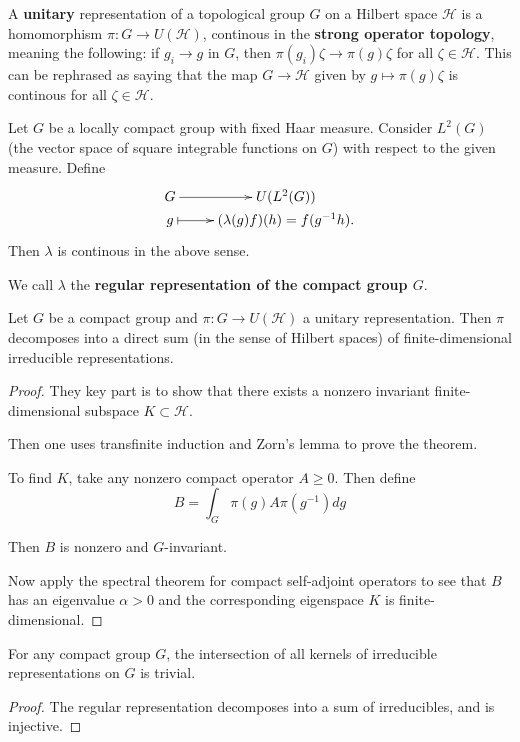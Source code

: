 \documentclass[11pt, english]{article}
\begin{document}
A \textbf{unitary} representation of a topological group $G$ on a Hilbert space $\mathcal H$ is a homomorphism $\pi:G \to U(\mathcal H)$, continous in the \textbf{strong operator topology}, meaning the following: if $g_i \to g$ in $G$, then $\pi(g_i) \zeta \to \pi(g)\zeta$ for all $\zeta \in \mathcal H$. This can be rephrased as saying that the map $G \to \mathcal H$ given by $g \mapsto \pi(g) \zeta $ is continous for all $\zeta \in \mathcal H$.

\begin{example}
 Let $G$ be a locally compact group with fixed Haar measure. Consider $L^2(G)$ (the vector space of square integrable functions on $G$) with respect to the given measure. Define
$$
\xymatrix @ R = 0mm{
G \ar[r] &U(L^2(G)) \\
g \ar@{|->}[r] & (\lambda(g)f)(h) = f(g^{-1}h).
}
$$
Then $\lambda$ is continous in the above sense.

We call $\lambda$ the \textbf{regular representation of the compact group $G$}.
\end{example}

\begin{thm}
\label{thmpeterweyl}
Let $G$ be a compact group and $\pi:G \to U(\mathcal H)$ a unitary representation. Then $\pi$ decomposes into a direct sum (in the sense of Hilbert spaces) of finite-dimensional irreducible representations.  
\end{thm}

\begin{proof}
They key part is to show that there exists a nonzero invariant finite-dimensional subspace $K \subset \mathcal H$. 

Then one uses transfinite induction and Zorn's lemma to prove the theorem.

To find $K$, take any nonzero compact operator $A \geq 0$. Then define 
$$
B = \int_G \pi(g) A \pi(g^{-1}) dg
$$

Then $B$ is nonzero and $G$-invariant. 

Now apply the spectral theorem for compact self-adjoint operators to see that $B$ has an eigenvalue $\alpha > 0$ and the corresponding eigenspace $K$ is finite-dimensional.
\end{proof}

\begin{corr}
For any compact group $G$, the intersection of all kernels of irreducible representations on $G$ is trivial.
\end{corr}
\begin{proof}
The regular representation decomposes into a sum of irreducibles, and is injective. 
\end{proof}
\end{document}
